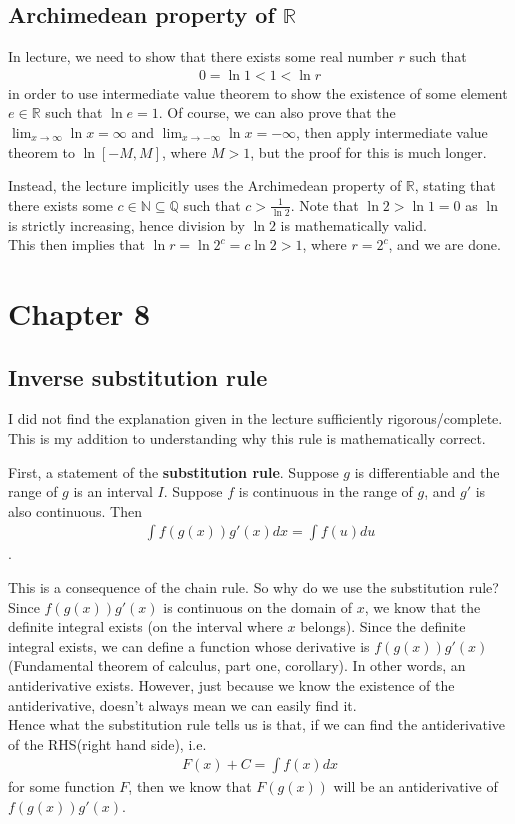 \documentclass{article}
\begin{document}
\subsection{Archimedean property of $\mathbb{R}$}
In lecture, we need to show that there exists some real number $r$ such that 
\begin{align*}
    0 = \ln 1 < 1 < \ln r
\end{align*}
in order to use intermediate value theorem to show the existence of some element $e\in \mathbb{R}$ such that $\ln e=1$. Of course, we can also prove that the $\lim_{x\rightarrow \infty}\ln x=\infty$ and $\lim_{x\rightarrow -\infty}\ln x=-\infty$, then apply intermediate value theorem to $\ln[-M, M]$, where $M>1$, but the proof for this is much longer.

Instead, the lecture implicitly uses the Archimedean property of $\mathbb{R}$, stating that there exists some $c\in \mathbb{N}\subseteq \mathbb{Q}$ such that $c>\frac{1}{\ln 2}$. Note that $\ln 2 > \ln 1=0$ as $\ln$ is strictly increasing, hence division by $\ln 2$ is mathematically valid. \\
This then implies that $\ln r = \ln 2^c = c\ln 2>1$, where $r=2^c$, and we are done.



\section{Chapter 8}
\subsection{Inverse substitution rule}
I did not find the explanation given in the lecture sufficiently rigorous/complete. This is my addition to understanding why this rule is mathematically correct.

First, a statement of the \textbf{substitution rule}.
Suppose $g$ is differentiable and the range of $g$ is an interval $I$. Suppose $f$ is continuous in the range of $g$, and $g'$ is also continuous.
Then 
\begin{align*}
    \int f(g(x))g'(x) dx=\int f(u) du
\end{align*}.

This is a consequence of the chain rule.
So why do we use the substitution rule? \\Since $f(g(x))g'(x)$ is continuous on the domain of $x$, we know that the definite integral exists (on the interval where $x$ belongs). Since the definite integral exists, we can define a function whose derivative is $f(g(x))g'(x)$ (Fundamental theorem of calculus, part one, corollary). In other words, an antiderivative exists. However, just because we know the existence of the antiderivative, doesn't always mean we can easily find it.\\
Hence what the substitution rule tells us is that, if we can find the antiderivative of the RHS(right hand side), i.e. 
\begin{align*}
    F(x) + C = \int f(x) dx
\end{align*}
for some function $F$, then we know that $F(g(x))$ will be an antiderivative of $f(g(x))g'(x)$.
\end{document}
